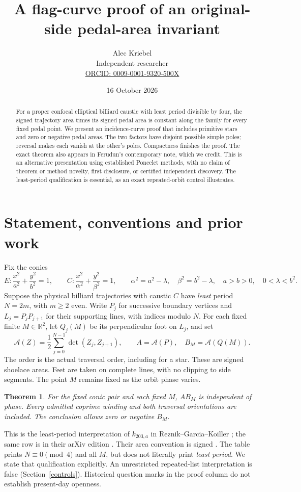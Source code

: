 \documentclass[11pt]{article}
\title{A flag-curve proof of an original-side pedal-area invariant}
\author{Alec Kriebel\\
\small Independent researcher\\
\small \href{https://orcid.org/0009-0001-9320-500X}{ORCID: 0009-0001-9320-500X}}
\date{16 October 2026}
\newtheorem{theorem}{Theorem}
\newcommand{\RR}{\mathbb R}
\newcommand{\area}{\mathcal A}
\begin{document}
\maketitle
\begin{abstract}
For a proper confocal elliptical billiard caustic with least period divisible
by four, the signed trajectory area times its signed pedal area is constant
along the family for every fixed pedal point. We present an incidence-curve
proof that includes primitive stars and zero or negative pedal areas.
The two factors have disjoint possible simple poles; reversal makes each
vanish at the other's poles. Compactness finishes the proof.
The exact theorem also appears in Ferudun's contemporary note, which we
credit. This is an alternative presentation using established Poncelet
methods, with no claim of theorem or method novelty, first disclosure,
or certified independent discovery. The least-period qualification is
essential, as an exact repeated-orbit control illustrates.
\end{abstract}

\section{Statement, conventions and prior work}
Fix the conics
\[
 E:\frac{x^2}{a^2}+\frac{y^2}{b^2}=1,\qquad
 C:\frac{x^2}{\alpha^2}+\frac{y^2}{\beta^2}=1,\qquad
 \alpha^2=a^2-\lambda,\quad\beta^2=b^2-\lambda,
 \quad a>b>0,\quad 0<\lambda<b^2 .
\]
Suppose the physical billiard trajectories with caustic \(C\) have
\emph{least} period \(N=2m\), with \(m\ge2\) even.
Write \(P_j\) for successive boundary vertices and \(L_j=P_jP_{j+1}\)
for their supporting lines, with indices modulo \(N\).
For each fixed finite \(M\in\RR^2\), let \(Q_j(M)\) be its perpendicular
foot on \(L_j\), and set
\[
 \area(Z)=\frac12\sum_{j=0}^{N-1}\det(Z_j,Z_{j+1}),
 \qquad A=\area(P),\quad B_M=\area(Q(M)).
\]
The order is the actual traversal order, including for a star.
These are signed shoelace areas. Feet are taken on complete lines,
with no clipping to side segments. The point \(M\) remains fixed as
the orbit phase varies.

\begin{theorem}\label{main}
For the fixed conic pair and each fixed \(M\), \(A B_M\) is independent
of phase. Every admitted coprime winding and both traversal orientations
are included. The conclusion allows zero or negative \(B_M\).
\end{theorem}

This is the least-period interpretation of \(k_{203,a}\) in
Reznik--Garcia--Koiller \cite[Section~3.3, Table~3, p.~346]{rgk};
the same row is in their arXiv edition \cite[Table~3, p.~6]{rgkarxiv}.
Their area convention is signed \cite[Eq.(1)]{rgk}. The table prints
\(N\equiv0\pmod4\) and all \(M\), but does not literally print
\emph{least period}. We state that qualification explicitly.
An unrestricted repeated-list interpretation is false
(Section~\ref{controls}). Historical question marks in the proof column
do not establish present-day openness.
\end{document}

